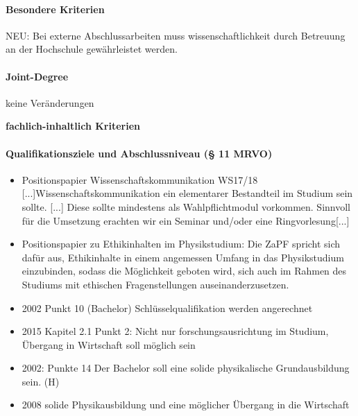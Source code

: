     \paragraph*{Besondere Kriterien}
      NEU: Bei externe Abschlussarbeiten muss wissenschaftlichkeit durch Betreuung an der Hochschule gewährleistet werden.

    \paragraph*{Joint-Degree}
      keine Veränderungen

  \textbf{fachlich-inhaltlich Kriterien} \\
    \paragraph*{Qualifikationsziele und Abschlussniveau (§ 11 MRVO)}
      \begin{itemize}
        \item Positionspapier Wissenschaftskommunikation WS17/18 [...]Wissenschaftskommunikation ein elementarer Bestandteil im Studium sein sollte. [...] Diese sollte mindestens als Wahlpflichtmodul vorkommen. Sinnvoll für die Umsetzung erachten wir ein Seminar und/oder eine Ringvorlesung[...]
        \item Positionspapier zu Ethikinhalten im Physikstudium: Die ZaPF spricht sich dafür aus, Ethikinhalte in einem angemessen Umfang in das Physikstudium einzubinden, sodass die Möglichkeit geboten wird, sich auch im Rahmen des Studiums mit ethischen Fragenstellungen auseinanderzusetzen.
        \item 2002 Punkt 10 (Bachelor) Schlüsselqualifikation werden angerechnet
        \item 2015 Kapitel 2.1 Punkt 2: Nicht nur forschungsausrichtung im Studium, Übergang in Wirtschaft soll möglich sein
        \item 2002: Punkte 14 Der Bachelor soll eine solide physikalische Grundausbildung sein. (H)
        \item 2008 solide Physikausbildung und eine möglicher Übergang in die Wirtschaft
      \end{itemize}

